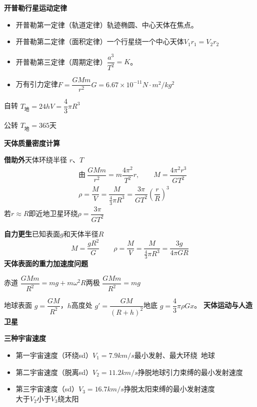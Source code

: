 \textbf{开普勒行星运动定律}
\begin{itemize}
  \item 开普勒第一定律（轨道定律）\quad 轨迹椭圆、中心天体在焦点。
  \item 开普勒第二定律（面积定律）\quad 一个行星绕一个中心天体\quad $V_1r_1=V_2r_2$
  \item 开普勒第三定律（周期定律）\quad $\dfrac{a^3}{T^2}=K$。
  \item 万有引力定律\quad $F=\dfrac{GMm}{r^2}$\quad $G=6.67\times10^{-11}\unit{N\cdot m^2/kg^2}$
\end{itemize}
自转 $T_{\text{地}}=24\unit{h}$\quad $V=\dfrac{4}{3}\pi R^3$

公转 $T_{\text{地}}=365$天

\textbf{天体质量密度计算}

\textbf{借助外}\quad 天体环绕半径 $r$、$T$
\begin{align*}
& \text{由}\ \dfrac{GMm}{r^2}=m\dfrac{4\pi^2}{T^2}r, \qquad M=\dfrac{4\pi^2r^3}{GT^2}\\
& \rho=\dfrac{M}{V}=\dfrac{M}{\frac{4}{3}\pi R^3}=\dfrac{3\pi}{GT^2}\left(\dfrac{r}{R}\right)^3
\end{align*}
若$r\approx R$即近地卫星环绕\quad $\rho=\dfrac{3\pi}{GT^2}$

\textbf{自力更生}\quad 已知表面$g$和天体半径$R$
\[ M=\dfrac{gR^2}{G}\qquad \rho=\dfrac{M}{V}=\dfrac{M}{\frac{4}{3}\pi R^3}=\dfrac{3g}{4\pi GR} \]
\textbf{天体表面的重力加速度问题}

赤道 $\dfrac{GMm}{R^2}=mg+m\omega^2R$\quad 两极\,\unclear{$\therefore$}\,$\dfrac{GMm}{R^2}=mg$

地球表面 $g=\dfrac{GM}{R^2}$，$h$高度处 $g'=\dfrac{GM}{(R+h)^2}$\quad 地底 $g=\dfrac{4}{3}\pi\rho Gx$。
\textbf{天体运动与人造卫星}

\textbf{三种宇宙速度}
\begin{itemize}
  \item 第一宇宙速度（环绕sd）\quad $V_1=7.9\unit{km/s}$\quad 最小发射、最大环绕\ 地球
  \item 第二宇宙速度（脱离sd）\quad $V_2=11.2\unit{km/s}$\quad 挣脱地球引力束缚的最小发射速度
  \item 第三宇宙速度（sd）\quad $V_3=16.7\unit{km/s}$\quad 挣脱太阳束缚的最小发射速度\\ 大于$V_2$小于$V_3$绕太阳
\end{itemize}

